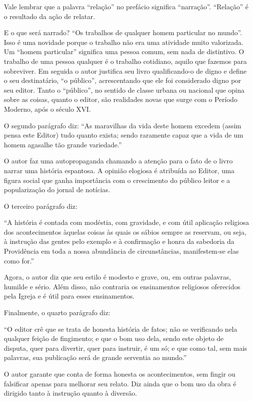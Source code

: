 \documentclass{article}
\begin{document}
Vale lembrar que a palavra ``relação'' no prefácio significa
``narração''. ``Relação'' é o resultado da ação de relatar.

E o que será narrado? ``Os trabalhos de qualquer homem particular no
mundo''. Isso é uma novidade porque o trabalho não era uma atividade
muito valorizada. Um ``homem particular'' significa uma pessoa comum,
sem nada de distintivo. O trabalho de uma pessoa qualquer é o trabalho
cotidiano, aquilo que fazemos para sobreviver. Em seguida o autor
justifica seu livro qualificando-o de digno e define o seu destinatário,
``o público'', acrescentando que ele foi considerado digno por seu
editor. Tanto o ``público'', no sentido de classe urbana ou nacional que
opina sobre as coisas, quanto o editor, são realidades novas que surge
com o Período Moderno, após o século XVI.

O segundo parágrafo diz: ``As maravilhas da vida deste homem excedem
(assim pensa este Editor) tudo quanto exista; sendo raramente capaz que
a vida de um homem agasalhe tão grande variedade.''

O autor faz uma autopropaganda chamando a atenção para o fato de o livro
narrar uma história espantosa. A opinião elogiosa é atribuída ao Editor,
uma figura social que ganha importância com o crescimento do público
leitor e a popularização do jornal de notícias.

O terceiro parágrafo diz:

``A história é contada com modéstia, com gravidade, e com útil aplicação
religiosa dos acontecimentos àquelas coisas às quais os sábios sempre as
reservam, ou seja, à instrução das gentes pelo exemplo e à confirmação e
honra da sabedoria da Providência em toda a nossa abundância de
circunstâncias, manifestem-se elas como for.''

Agora, o autor diz que seu estilo é modesto e grave, ou, em outras
palavras, humilde e sério. Além disso, não contraria os ensinamentos
religiosos oferecidos pela Igreja e é útil para esses ensinamentos.

Finalmente, o quarto parágrafo diz:

``O editor crê que se trata de honesta história de fatos; não se
verificando nela qualquer feição de fingimento; e que o bom uso dela,
sendo este objeto de disputa, quer para divertir, quer para instruir, é
um só; e que como tal, sem mais palavras, sua publicação será de grande
serventia ao mundo.''

O autor garante que conta de forma honesta os acontecimentos, sem fingir
ou falsificar apenas para melhorar seu relato. Diz ainda que o bom uso
da obra é dirigido tanto à instrução quanto à diversão.
\end{document}
